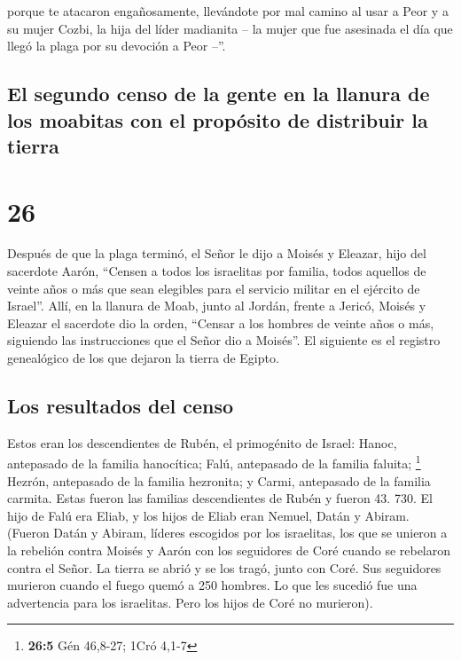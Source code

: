  porque te atacaron engañosamente, llevándote por mal
camino al usar a Peor y a su mujer Cozbi, la hija del líder madianita --
la mujer que fue asesinada el día que llegó la plaga por su devoción a
Peor --''.

\hypertarget{el-segundo-censo-de-la-gente-en-la-llanura-de-los-moabitas-con-el-propuxf3sito-de-distribuir-la-tierra}{%
\subsection{El segundo censo de la gente en la llanura de los moabitas
con el propósito de distribuir la
tierra}\label{el-segundo-censo-de-la-gente-en-la-llanura-de-los-moabitas-con-el-propuxf3sito-de-distribuir-la-tierra}}

\hypertarget{section-25}{%
\section{26}\label{section-25}}

 Después de que la plaga terminó, el Señor le dijo a
Moisés y Eleazar, hijo del sacerdote Aarón,  ``Censen a
todos los israelitas por familia, todos aquellos de veinte años o más
que sean elegibles para el servicio militar en el ejército de Israel''.
 Allí, en la llanura de Moab, junto al Jordán, frente a
Jericó, Moisés y Eleazar el sacerdote dio la orden, 
``Censar a los hombres de veinte años o más, siguiendo las instrucciones
que el Señor dio a Moisés''. El siguiente es el registro genealógico de
los que dejaron la tierra de Egipto.

\hypertarget{los-resultados-del-censo-1}{%
\subsection{Los resultados del censo}\label{los-resultados-del-censo-1}}

 Estos eran los descendientes de Rubén, el primogénito de
Israel: Hanoc, antepasado de la familia hanocítica; Falú, antepasado de
la familia faluita; \footnote{\textbf{26:5} Gén 46,8-27; 1Cró 4,1-7}
 Hezrón, antepasado de la familia hezronita; y Carmi,
antepasado de la familia carmita.  Estas fueron las
familias descendientes de Rubén y fueron 43. 730.  El hijo
de Falú era Eliab,  y los hijos de Eliab eran Nemuel,
Datán y Abiram. (Fueron Datán y Abiram, líderes escogidos por los
israelitas, los que se unieron a la rebelión contra Moisés y Aarón con
los seguidores de Coré cuando se rebelaron contra el Señor.
 La tierra se abrió y se los tragó, junto con Coré. Sus
seguidores murieron cuando el fuego quemó a 250 hombres. Lo que les
sucedió fue una advertencia para los israelitas.  Pero
los hijos de Coré no murieron).

